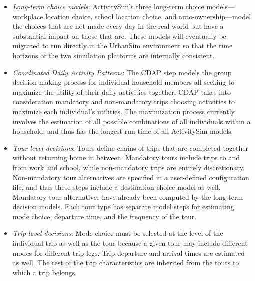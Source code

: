 \begin{itemize}
    \item \emph{Long-term choice models}: ActivitySim's three long-term choice models---workplace location choice, school location choice, and auto-ownership---model the choices that are not made every day in the real world but have a substantial impact on those that are. These models will eventually be migrated to run directly in the UrbanSim environment so that the time horizons of the two simulation platforms are internally consistent.
    \item \emph{Coordinated Daily Activity Patterns}: The CDAP step models the group decision-making process for individual household members all seeking to maximize the utility of their daily activities together. CDAP takes into consideration mandatory and non-mandatory trips choosing activities to maximize each individual's utilities. The maximization process currently involves the estimation of all possible combinations of all individuals within a household, and thus has the longest run-time of all ActivitySim models.
    \item \emph{Tour-level decisions}: Tours define chains of trips that are completed together without returning home in between. Mandatory tours include trips to and from work and school, while non-mandatory trips are entirely discretionary. Non-mandatory tour alternatives are specified in a user-defined configuration file, and thus these steps include a destination choice model as well. Mandatory tour alternatives have already been computed by the long-term decision models. Each tour type has separate model steps for estimating mode choice, departure time, and the frequency of the tour.
    \item \emph{Trip-level decisions}: Mode choice must be selected at the level of the individual trip as well as the tour because a given tour may include different modes for different trip legs. Trip departure and arrival times are estimated as well. The rest of the trip characteristics are inherited from the tours to which a trip belongs. 
\end{itemize}

